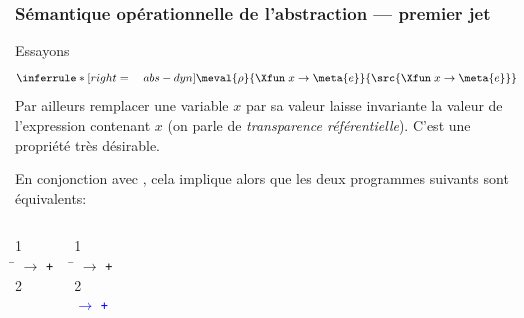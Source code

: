 %
\begin{frame}
\frametitle{Sémantique opérationnelle de l'abstraction --- premier jet}

Essayons
\[
\inferrule*[right=\quad abs-dyn]
  {}
  {\meval{\rho}
         {\Xfun \; x \rightarrow \meta{e}}
         {\src{\Xfun \; x \rightarrow \meta{e}}}}
\]
Par ailleurs remplacer une variable $x$ par sa valeur laisse
invariante la valeur de l'expression contenant $x$ (on parle de
\emph{transparence référentielle}). C'est une propriété très
désirable.

\bigskip
En conjonction avec , cela implique alors que
les deux programmes suivants sont équivalents:
\begin{columns}
{\small
\begin{tabbing}
\Xlet {} \equal \num{1} \Xin \\
\quad \= \Xlet {} \equal \Xfun {} \(\rightarrow\)
 \texttt{+}  \Xin \\
\> \Xlet {} \equal \num{2} \\
\Xin \textcolor{blue}{} 
\end{tabbing}
}
{\small
\begin{tabbing}
\Xlet {} \equal \num{1} \Xin\\
\quad \= \Xlet {} \equal \Xfun {} \(\rightarrow\)
 \texttt{+}  \Xin\\
\> \Xlet {} \equal \num{2}\\
\Xin \textcolor{blue}{\lpar\Xfun {} \(\rightarrow\)  \texttt{+}
\rpar} 
\end{tabbing}
}
\end{columns}

\end{frame}

